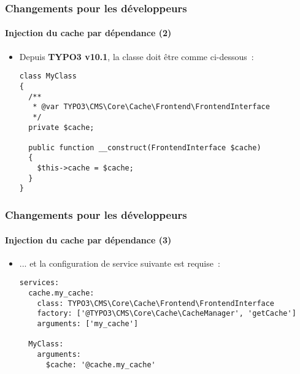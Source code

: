 
\begin{frame}[fragile]
	\frametitle{Changements pour les développeurs}
	\framesubtitle{Injection du cache par dépendance (2)}

	\lstset{basicstyle=\tiny\ttfamily}

	\begin{itemize}
		\item Depuis \textbf{TYPO3 v10.1}, la classe doit être comme ci-dessous~:

\begin{lstlisting}
class MyClass
{
  /**
   * @var TYPO3\CMS\Core\Cache\Frontend\FrontendInterface
   */
  private $cache;

  public function __construct(FrontendInterface $cache)
  {
    $this->cache = $cache;
  }
}
\end{lstlisting}

	\end{itemize}

\end{frame}


\begin{frame}[fragile]
	\frametitle{Changements pour les développeurs}
	\framesubtitle{Injection du cache par dépendance (3)}

	\lstset{basicstyle=\tiny\ttfamily}

	\begin{itemize}
		\item ... et la configuration de service suivante est requise~:

\begin{lstlisting}
services:
  cache.my_cache:
    class: TYPO3\CMS\Core\Cache\Frontend\FrontendInterface
    factory: ['@TYPO3\CMS\Core\Cache\CacheManager', 'getCache']
    arguments: ['my_cache']

  MyClass:
    arguments:
      $cache: '@cache.my_cache'
\end{lstlisting}

	\end{itemize}

\end{frame}

